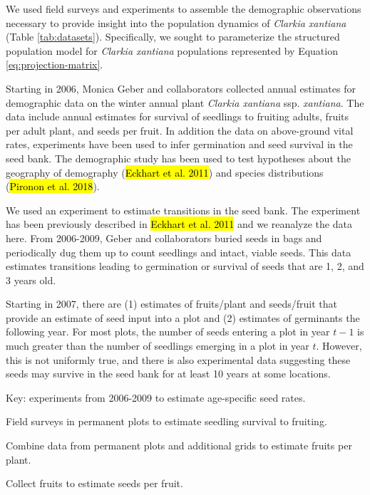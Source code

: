 \documentclass[12pt, oneside, titlepage]{article}   	%
\begin{document}
We used field surveys and experiments to assemble the demographic observations necessary to provide insight into the population dynamics of \textit{Clarkia xantiana} (Table \ref{tab:datasets}). Specifically, we sought to parameterize the structured population model for \textit{Clarkia xantiana} populations represented by Equation \ref{eq:projection-matrix}. 

Starting in 2006, Monica Geber and collaborators collected annual estimates for demographic data on the winter annual plant \textit{Clarkia xantiana} ssp. \textit{xantiana}. The data include annual estimates for survival of seedlings to fruiting adults, fruits per adult plant, and seeds per fruit. In addition the data on above-ground vital rates, experiments have been used to infer germination and seed survival in the seed bank. The demographic study has been used to test hypotheses about the geography of demography (\hl{Eckhart et al. 2011}) and species distributions (\hl{Pironon et al. 2018}).

We used an experiment to estimate transitions in the seed bank. The experiment has been previously described in \hl{Eckhart et al. 2011} and we reanalyze the data here. From 2006-2009, Geber and collaborators buried seeds in bags and periodically dug them up to count seedlings and intact, viable seeds. This data estimates transitions leading to germination or survival of seeds that are 1, 2, and 3 years old.

Starting in 2007, there are (1) estimates of fruits/plant and seeds/fruit that provide an estimate of seed input into a plot and (2) estimates of germinants the following year. For most plots, the number of seeds entering a plot in year $t-1$ is much greater than the number of seedlings emerging in a plot in year $t$. However, this is not uniformly true, and there is also experimental data suggesting these seeds may survive in the seed bank for at least 10 years at some locations.

Key: experiments from 2006-2009 to estimate age-specific seed rates.

Field surveys in permanent plots to estimate seedling survival to fruiting.

Combine data from permanent plots and additional grids to estimate fruits per plant.

Collect fruits to estimate seeds per fruit. 

%
\singlespace
{} \label{tab:datasets} 
\begin{center}

\end{center}
\doublespace
\end{document}
